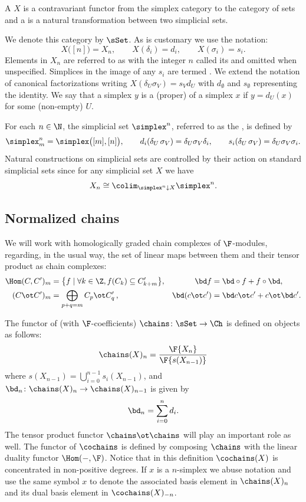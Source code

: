 A  $X$ is a contravariant functor from the simplex category to the category of sets and a  is a natural transformation between two simplicial sets.

We denote this category by $\sSet$.
As is customary we use the notation:
\[
X \big( [n] \big) = X_n, \qquad
X(\delta_i) = d_i, \qquad
X(\sigma_i) = s_i.
\]
Elements in $X_n$ are referred to as \mbox{} with the integer $n$ called its  and omitted when unspecified.
Simplices in the image of any $s_i$ are termed .
We extend the notation of canonical factorizations writing $X(\delta_U \sigma_V) = s_V d_U$ with $d_\emptyset$ and $s_\emptyset$ representing the identity.
We say that a simplex $y$ is a (proper)  of a simplex $x$ if $y = d_U(x)$ for some (non-empty) $U$.

For each $n \in \N$, the simplicial set $\simplex^n$, referred to as the , is defined by
\[
\simplex^n_m = \simplex \big( [m], [n] \big), \qquad
d_i(\delta_U\, \sigma_V) = \delta_U \sigma_V \delta_i, \qquad
s_i(\delta_U\, \sigma_V) = \delta_U \sigma_V \sigma_i.
\]
Natural constructions on simplicial sets are controlled by their action on standard simplicial sets since for any simplicial set $X$ we have
\[
X_n \cong \colim_{\simplex^n \downarrow X} \simplex^n.
\]

\subsection{Normalized chains}

We will work with homologically graded chain complexes of $\F$-modules, regarding, in the usual way, the set of linear maps between them and their tensor product as chain complexes:
\begin{align*}
\Hom(C, C^\prime)_m &= \big\{f \mid \forall k \in \Z, f(C_k) \subseteq C^\prime_{k+m} \big\},
&\bd f &= \bd \circ f + f \circ \bd, \\
(C \ot C^\prime)_m &= \bigoplus_{p + q = m} C_p \ot C^\prime_q \,,
&\bd (c \ot c^\prime) &= \bd c \ot c^\prime + c \ot \bd c^\prime.
\end{align*}

The functor of  (with $\F$-coefficients) $\chains \colon \sSet \to \Ch$ is defined on objects as follows:
\[
\chains(X)_n = \frac{\F \{ X_n \}}{\F \{ s(X_{n-1}) \}}
\]
where $s(X_{n-1}) = \bigcup_{i=0}^{n-1} s_i(X_{n-1})$, and $\bd_n \colon \chains(X)_n \to \chains(X)_{n-1}$ is given by
\[
\bd_n = \sum_{i = 0}^{n} d_{i}.
\]
The tensor product functor $\chains \ot \chains$ will play an important role as well.
The functor of  $\cochains$ is defined by composing $\chains$ with the linear duality functor $\Hom(-, \F)$.
Notice that in this definition $\cochains(X)$ is concentrated in non-positive degrees.
If $x$ is a $n$-simplex we abuse notation and use the same symbol $x$ to denote the associated basis element in $\chains(X)_n$ and its dual basis element in $\cochains(X)_{-n}$.